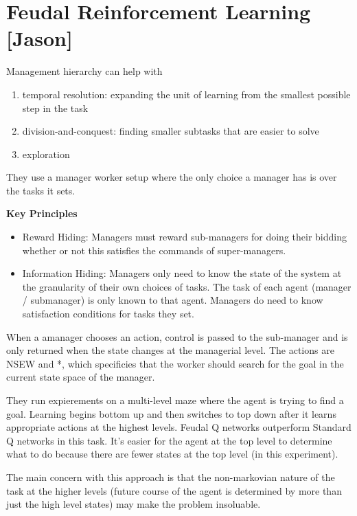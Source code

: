 \section{Feudal Reinforcement Learning [Jason]}

Management hierarchy can help with
\begin{enumerate}
    \item temporal resolution: expanding the unit of learning from the smallest possible step in the task
    \item division-and-conquest: finding smaller subtasks that are easier to solve
    \item exploration
\end{enumerate}

They use a manager worker setup where the only choice a manager has is over the tasks it sets.

\textbf{Key Principles}
\begin{itemize}
    \item Reward Hiding: Managers must reward sub-managers for doing their bidding whether or not this
          satisfies the commands of super-managers.
    \item Information Hiding: Managers only need to know the state of the system at the granularity of
          their own choices of tasks. The task of each agent (manager / submanager) is only known to that
          agent. Managers do need to know satisfaction conditions for tasks they set.
\end{itemize}

When a amanager chooses an action, control is passed to the sub-manager and is only returned when
the state changes at the managerial level. The actions are NSEW and *, which specificies that
the worker should search for the goal in the current state space of the manager.

They run expierements on a multi-level maze where the agent is trying to find a goal.
Learning begins bottom up and then switches to top down after it learns appropriate actions
at the highest levels. Feudal Q networks outperform Standard Q networks in this task.
It's easier for the agent at the top level to determine what to do because there are
fewer states at the top level (in this experiment).

The main concern with this approach is that the non-markovian nature of the task at the
higher levels (future course of the agent is determined by more than just the high level states)
may make the problem insoluable.



